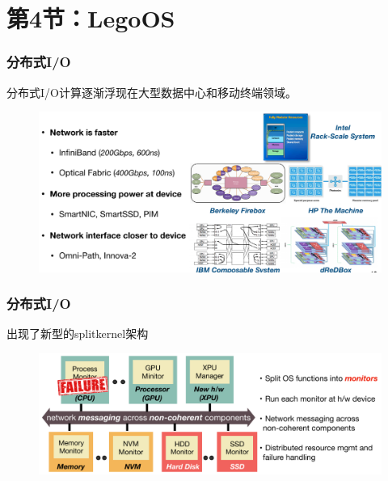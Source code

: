 \section{第4节：LegoOS} %
\begin{frame}[fragile]
    \frametitle{分布式I/O}
    分布式I/O计算逐渐浮现在大型数据中心和移动终端领域。
  
   
    
        \begin{figure}
        \includegraphics[width=0.9\linewidth]{figs/disio-current.png}
        \end{figure}
\end{frame}

\begin{frame}[fragile]
    \frametitle{分布式I/O}
    出现了新型的splitkernel架构
    
    
    
    \begin{figure}
        \includegraphics[width=0.9\linewidth]{figs/disio-splitkernel.png}
    \end{figure}
\end{frame}

